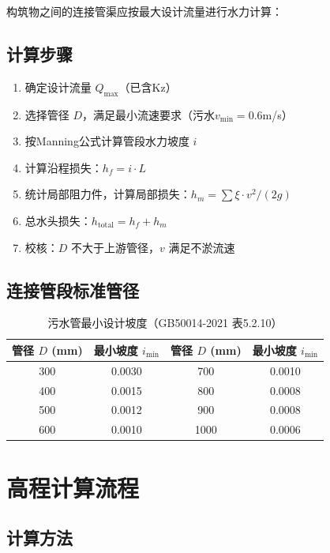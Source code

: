 \documentclass[12pt,a4paper]{ctexart}
\begin{document}
构筑物之间的连接管渠应按最大设计流量进行水力计算：

\subsection{计算步骤}

\begin{enumerate}[nosep]
    \item 确定设计流量 $Q_{\max}$（已含Kz）
    \item 选择管径 $D$，满足最小流速要求（污水$v_{\min}=0.6$m/s）
    \item 按Manning公式计算管段水力坡度 $i$
    \item 计算沿程损失：$h_f = i \cdot L$
    \item 统计局部阻力件，计算局部损失：$h_m = \sum \xi \cdot v^2/(2g)$
    \item 总水头损失：$h_{\text{total}} = h_f + h_m$
    \item 校核：$D$ 不大于上游管径，$v$ 满足不淤流速
\end{enumerate}

\subsection{连接管段标准管径}

\begin{table}[htbp]
\centering
\caption{污水管最小设计坡度（GB50014-2021 表5.2.10）}
\label{tab:min_slope}
\begin{tabular}{@{}cccc@{}}
\toprule
\textbf{管径 $D$ (mm)} & \textbf{最小坡度 $i_{\min}$} & \textbf{管径 $D$ (mm)} & \textbf{最小坡度 $i_{\min}$} \\
\midrule
300  & 0.0030  & 700  & 0.0010 \\
400  & 0.0015  & 800  & 0.0008 \\
500  & 0.0012  & 900  & 0.0008 \\
600  & 0.0010  & 1000 & 0.0006 \\
\bottomrule
\end{tabular}
\end{table}

\section{高程计算流程}

\subsection{计算方法}
\end{document}
